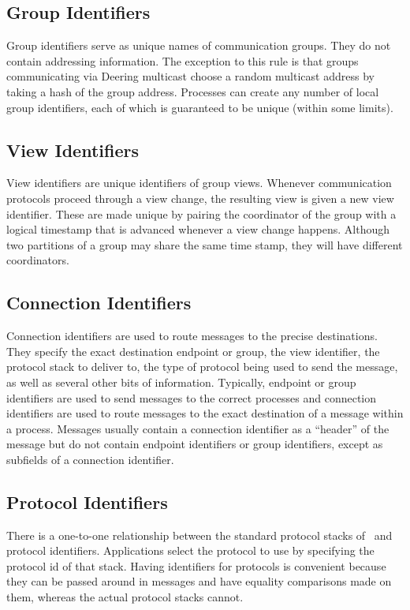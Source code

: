 \subsection{Group Identifiers}
Group identifiers serve as unique names of communication groups.  They do not contain
addressing information.  The exception to this rule is that groups communicating via
Deering multicast choose a random multicast address by taking a hash of the group
address.  Processes can create any number of local group identifiers, each of which
is guaranteed to be unique (within some limits).

\subsection{View Identifiers}
View identifiers are unique identifiers of group views.  Whenever communication
protocols proceed through a view change, the resulting view is given a new view
identifier.  These are made unique by pairing the coordinator of the group with a
logical timestamp that is advanced whenever a view change happens.  Although two
partitions of a group may share the same time stamp, they will have different
coordinators.

\subsection{Connection Identifiers}
Connection identifiers are used to route messages to the precise destinations.  They
specify the exact destination endpoint or group, the view identifier, the protocol
stack to deliver to, the type of protocol being used to send the message, as well as
several other bits of information.  Typically, endpoint or group identifiers are used
to send messages to the correct processes and connection identifiers are used to
route messages to the exact destination of a message within a process.  Messages
usually contain a connection identifier as a ``header'' of the message but do not
contain endpoint identifiers or group identifiers, except as subfields of a
connection identifier.

\subsection{Protocol Identifiers}
There is a one-to-one relationship between the standard protocol stacks of \ensemble\
and protocol identifiers.  Applications select the protocol to use by specifying the
protocol id of that stack.  Having identifiers for protocols is convenient because
they can be passed around in messages and have equality comparisons made on them,
whereas the actual protocol stacks cannot.

